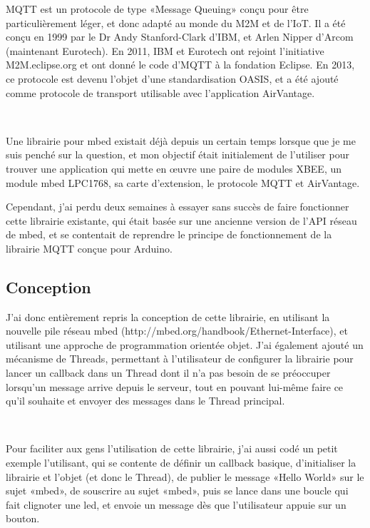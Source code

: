 \documentclass{article}
\begin{document}
MQTT est un protocole de type «Message Queuing» conçu pour être particulièrement léger, et donc adapté au monde du M2M et de l’IoT. Il a été conçu en 1999 par le Dr Andy Stanford-Clark d’IBM, et Arlen Nipper d’Arcom (maintenant Eurotech). En 2011, IBM et Eurotech ont rejoint l’initiative M2M.eclipse.org et ont donné le code d’MQTT à la fondation Eclipse. En 2013, ce protocole est devenu l’objet d’une standardisation OASIS, et a été ajouté comme protocole de transport utilisable avec l’application AirVantage.

~

Une librairie pour mbed existait déjà depuis un certain temps lorsque que je me suis penché sur la question, et mon objectif était initialement de l’utiliser pour trouver une application qui mette en œuvre une paire de modules XBEE, un module mbed LPC1768, sa carte d’extension, le protocole MQTT et AirVantage.

Cependant, j’ai perdu deux semaines à essayer sans succès de faire fonctionner cette librairie existante, qui était basée sur une ancienne version de l’API réseau de mbed, et se contentait de reprendre le principe de fonctionnement de la librairie MQTT conçue pour Arduino.

\subsection{Conception}

J’ai donc entièrement repris la conception de cette librairie, en utilisant la nouvelle pile réseau mbed (http://mbed.org/handbook/Ethernet-Interface), et utilisant une approche de programmation orientée objet. J’ai également ajouté un mécanisme de Threads, permettant à l’utilisateur de configurer la librairie pour lancer un callback dans un Thread dont il n’a pas besoin de se préoccuper lorsqu’un message arrive depuis le serveur, tout en pouvant lui-même faire ce qu’il souhaite et envoyer des messages dans le Thread principal.

~

Pour faciliter aux gens l’utilisation de cette librairie, j’ai aussi codé un petit exemple l’utilisant, qui se contente de définir un callback basique, d’initialiser la librairie et l’objet (et donc le Thread), de publier le message «Hello World» sur le sujet «mbed», de souscrire au sujet «mbed», puis se lance dans une boucle qui fait clignoter une led, et envoie un message dès que l’utilisateur appuie sur un bouton.

~
\end{document}
